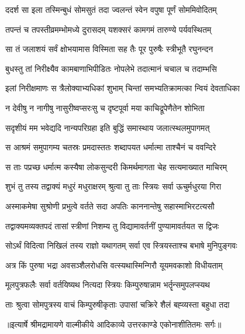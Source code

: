 \twolineshloka
{ददर्श सा इला तस्मिन्बुधं सोमसुतं तदा}
{ज्वलन्तं स्वेन वपुषा पूर्णं सोममिवोदितम्} %

\twolineshloka
{तपन्तं च तपस्तीव्रमम्भोमध्ये दुरासदम्}
{यशक्सरं कामगमं तारुण्ये पर्यवस्थितम्} %

\twolineshloka
{सा तं जलाशयं सर्वं क्षोभयामास विस्मिता}
{सह तैः पूर पुरुषैः स्त्रीभूतै रघुनन्दन} %

\twolineshloka
{बुधस्तु तां निरीक्ष्यैव कामबाणाभिपीडितः}
{नोपलेभे तदात्मानं चचाल च तदाम्भसि} %

\twolineshloka
{इलां निरीक्षमाणः स त्रैलोक्याभ्यधिकां शुभाम्}
{चिन्तां समभ्यतिक्रामत्का न्वियं देवताधिका} %

\twolineshloka
{न देवीषु न नागीषु नासुरीष्वप्सरःसु च}
{दृष्टपूर्वा मया काचिद्रूपेणैतेन शोभिता} %

\twolineshloka
{सदृशीयं मम भवेद्यदि नान्यपरिग्रहा}
{इति बुद्धिं समास्थाय जलात्स्थलमुपागमत्} %

\twolineshloka
{स आश्रमं समुपागम्य चतस्रः प्रमदास्ततः}
{शब्दापयत धर्मात्मा ताश्चैनं च ववन्दिरे} %

\twolineshloka
{स ताः पप्रच्छ धर्मात्म कस्यैषा लोकसुन्दरी}
{किमर्थमागता चेह सत्यमाख्यात माचिरम्} %

\twolineshloka
{शुभं तु तस्य तद्वाक्यं मधुरं मधुराक्षरम्}
{श्रुत्वा तु ताः स्त्रियः सर्वा ऊचुर्मधुरया गिरा} %

\twolineshloka
{अस्माकमेषा सुश्रोणी प्रभुत्वे वर्तते सदा}
{अपतिः काननान्तेषु सहास्माभिरटत्यसौ} %

\twolineshloka
{तद्वाक्यमव्यक्तपदं तासां स्त्रीणां निशम्य तु}
{विद्यामावर्तनीं पुण्यामावर्तयत स द्विजः} %

\twolineshloka
{सोऽर्थं विदित्वा निखिलं तस्य राज्ञो यथागतम्}
{सर्वा एव स्त्रियस्ताश्च बभाषे मुनिपुङ्गवः} %

\twolineshloka
{अत्र किं पुरुषा भद्रा अवसञ्शैलरोधसि}
{वत्स्यथास्मिन्गिरौ यूयमवकाशो विधीयताम्} %

\twolineshloka
{मूलपुत्रफलैः सर्वा वर्तयिष्यथ नित्यदा}
{स्त्रियः किम्पुरुषान्नाम भर्तॄन्समुपलप्स्यथ} %

\twolineshloka
{ताः श्रुत्वा सोमपुत्रस्य वाचं किम्पुरुषीकृताः}
{उपासां चक्रिरे शैलं बह्व्यस्ता बहुधा तदा} %


{॥इत्यार्षे श्रीमद्रामायणे वाल्मीकीये आदिकाव्ये उत्तरकाण्डे एकोनाशीतितमः सर्गः॥}


